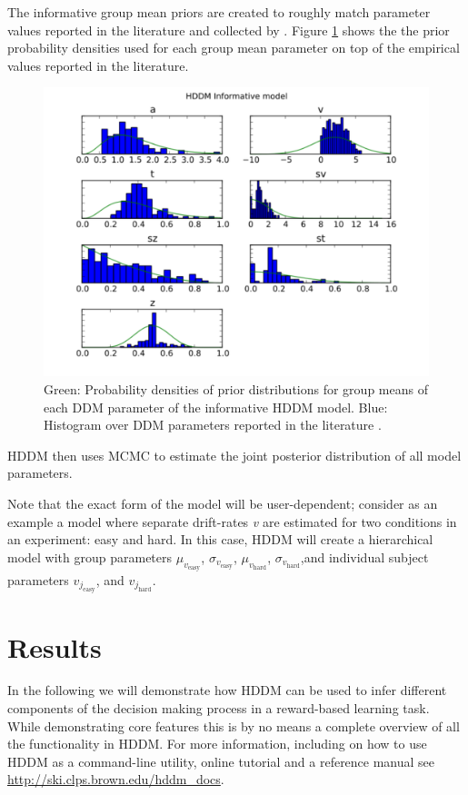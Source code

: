 \documentclass[letterpaper,10pt,english]{article}
\begin{document}
The informative group mean priors are created to roughly match parameter values reported in the literature and collected by \citep{MatzkeWagenmakers09}. Figure \ref{fig.priors} shows the the prior probability densities used for each group mean parameter on top of the empirical values reported in the literature.
\begin{figure}[htbp]
\centering
\includegraphics[scale=.5]{hddm_info_priors.pdf}
\caption{Green: Probability densities of prior distributions for group means of each DDM parameter of the informative HDDM model. Blue: Histogram over DDM parameters reported in the literature \citep{MatzkeWagenmakers09}.}
\label{fig.priors}
\end{figure}

HDDM then uses MCMC to estimate the joint posterior distribution of
all model parameters.

Note that the exact form of the model will be user-dependent; consider as an example a model where separate drift-rates \emph{v} are estimated for two conditions in an experiment: easy and hard. In this case, HDDM will create a hierarchical model with group parameters $\mu_{v_{\text{easy}}}$, $\sigma_{v_{\text{easy}}}$, $\mu_{v_{\text{hard}}}$, $\sigma_{v_{\text{hard}}}$,and individual subject parameters $v_{j_{\text{easy}}}$, and $v_{j_{\text{hard}}}$.

\section*{Results}
\label{demo:index-0}\label{demo:demo}\label{demo:chap-demo}\label{demo::doc}\label{demo:patsy}
In the following we will demonstrate how HDDM can be used to infer different components of the decision making process in a reward-based learning task. While demonstrating core features this is by no means a complete overview of all the functionality in HDDM. For more information, including on how to use HDDM as a command-line utility, online tutorial and a reference manual see \href{http://ski.clps.brown.edu/hddm\_docs}{http://ski.clps.brown.edu/hddm\_docs}.
\end{document}
